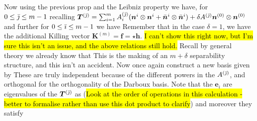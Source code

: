 \documentclass{article}
\begin{document}
Now using the previous prop and the Leibniz property we have, for $0 \leq {\bar{\jmath}} \leq m-1$ recalling $ \bm{T}^{({\bar{\jmath}})} = \sum_{i=1}^m A^{({\bar{\jmath}})}_i (\bm{n}^i \otimes \bm{n}^i + \bar{\bm{n}}^i \otimes \bar{\bm{n}}^i) + \delta A^{({\bar{\jmath}})}\bm{n}^{(0)} \otimes \bm{n}^{(0)}$ 
and further for $0 \leq {\bar{\imath}} \leq m-1$ we have 
Remember that in the case $\delta=1$, we have the additional Killing vector $\bm{K}^{(m)} = \bm{f} = \star\bm{h}$. \hl{ I can't show this right now, but I'm sure this isn't an issue, and the above relations still hold.} 
Recall by general theory we already know that 
This is the making of an $m+\delta$ separability structure, and this isn't an accident. Now once again construct a new basis given by 
These are truly independent because of the different powers in the $A^{({\bar{\jmath}})}$, and orthogonal for the orthogonality of the Darboux basis. Note that the $\bm{e}_i$ are eigenvalues of the $\bm{T}^{({\bar{\jmath}})}$ as 
(\hl{Look at the order of operations in this calculation - better to formalise rather than use this dot product to clarify}) and moreover they satisfy 
\end{document}
